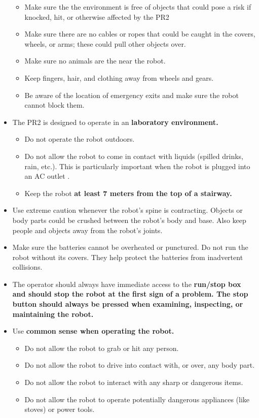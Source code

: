 \begin{itemize}
\begin{itemize}
\item Make sure the the environment is free of objects that could pose a risk if knocked, hit, or otherwise affected by the PR2
\item Make sure there are no cables or ropes that could be caught in the covers, wheels, or arms; these could pull other objects over.
\item Make sure no animals are the near the robot.
\item Keep fingers, hair, and clothing away from wheels and gears.
\item Be aware of the location of emergency exits and make sure the robot cannot block them.
\end{itemize}
\item The PR2 is designed to operate in an \bf{laboratory environment}.
\begin{itemize}
\item Do not operate the robot outdoors.
\item Do not allow the robot to come in contact with liquids (spilled drinks, rain, etc.). This is particularly important when the robot is plugged into an AC outlet .
\item Keep the robot \bf{at least 7 meters from the top of a stairway}.
\end{itemize}
\item Use extreme caution whenever the robot's spine is contracting. Objects or body parts could be crushed between the robot's body and base. Also keep people and objects away from the robot's joints.
\item Make sure the batteries cannot be overheated or punctured.  Do not run the robot without its covers. They help protect the batteries from inadvertent collisions.
\item The operator should always have immediate access to the \bf{run/stop} box and should stop the robot at the first sign of a problem. The stop button should always be pressed when examining, inspecting, or maintaining the robot.
\item Use \bf{common sense} when operating the robot.
\begin{itemize}
\item Do not allow the robot to grab or hit any person.
\item Do not allow the robot to drive into contact with, or over, any body part.
\item Do not allow the robot to interact with any sharp or dangerous items.
\item Do not allow the robot to operate potentially dangerous appliances (like stoves) or power tools.

\end{itemize}
\end{itemize}
